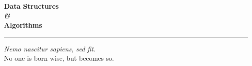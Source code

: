 \documentclass[11pt,a4paper,oneside,openany]{book}
\begin{document}
\frontmatter

\hypersetup{pageanchor=false}
\begin{titlepage}
  \centering
  \vspace*{0.22\textheight}
  {\headfont\bfseries\fontsize{34}{44}\selectfont Data Structures\\{\rmfamily\itshape\mdseries\color{thmcolor}\&}\\Algorithms\par}
  \vspace{14pt}
  {\color{thmcolor}\rule{0.35\textwidth}{1.2pt}\par}
  \vspace{12pt}
  {\Large\itshape \booksubtitle\par}
  \vfill
  {\large \bookauthor\par}
  \vspace{6pt}
  {\fontsize{10.5}{13}\selectfont\color{muted}\textit{Nemo nascitur sapiens, sed fit.}\\No one is born wise, but becomes so.\par}
  \vspace{4pt}
\end{titlepage}
\hypersetup{pageanchor=true}

{\hypersetup{linkcolor=ink}\tableofcontents}



\mainmatter

\backmatter
\end{document}
